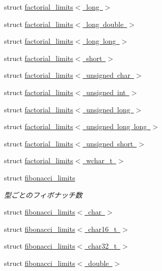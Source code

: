 \begin{DoxyCompactItemize}
struct \mbox{\hyperlink{structsaki_1_1factorial__limits_3_01long_01_4}{factorial\+\_\+limits$<$ long $>$}}
\item 
struct \mbox{\hyperlink{structsaki_1_1factorial__limits_3_01long_01double_01_4}{factorial\+\_\+limits$<$ long double $>$}}
\item 
struct \mbox{\hyperlink{structsaki_1_1factorial__limits_3_01long_01long_01_4}{factorial\+\_\+limits$<$ long long $>$}}
\item 
struct \mbox{\hyperlink{structsaki_1_1factorial__limits_3_01short_01_4}{factorial\+\_\+limits$<$ short $>$}}
\item 
struct \mbox{\hyperlink{structsaki_1_1factorial__limits_3_01unsigned_01char_01_4}{factorial\+\_\+limits$<$ unsigned char $>$}}
\item 
struct \mbox{\hyperlink{structsaki_1_1factorial__limits_3_01unsigned_01int_01_4}{factorial\+\_\+limits$<$ unsigned int $>$}}
\item 
struct \mbox{\hyperlink{structsaki_1_1factorial__limits_3_01unsigned_01long_01_4}{factorial\+\_\+limits$<$ unsigned long $>$}}
\item 
struct \mbox{\hyperlink{structsaki_1_1factorial__limits_3_01unsigned_01long_01long_01_4}{factorial\+\_\+limits$<$ unsigned long long $>$}}
\item 
struct \mbox{\hyperlink{structsaki_1_1factorial__limits_3_01unsigned_01short_01_4}{factorial\+\_\+limits$<$ unsigned short $>$}}
\item 
struct \mbox{\hyperlink{structsaki_1_1factorial__limits_3_01wchar__t_01_4}{factorial\+\_\+limits$<$ wchar\+\_\+t $>$}}
\item 
struct \mbox{\hyperlink{structsaki_1_1fibonacci__limits}{fibonacci\+\_\+limits}}
\begin{DoxyCompactList}\small\item\em 型ごとのフィボナッチ数 \end{DoxyCompactList}\item 
struct \mbox{\hyperlink{structsaki_1_1fibonacci__limits_3_01char_01_4}{fibonacci\+\_\+limits$<$ char $>$}}
\item 
struct \mbox{\hyperlink{structsaki_1_1fibonacci__limits_3_01char16__t_01_4}{fibonacci\+\_\+limits$<$ char16\+\_\+t $>$}}
\item 
struct \mbox{\hyperlink{structsaki_1_1fibonacci__limits_3_01char32__t_01_4}{fibonacci\+\_\+limits$<$ char32\+\_\+t $>$}}
\item 
struct \mbox{\hyperlink{structsaki_1_1fibonacci__limits_3_01double_01_4}{fibonacci\+\_\+limits$<$ double $>$}}

\end{DoxyCompactItemize}

